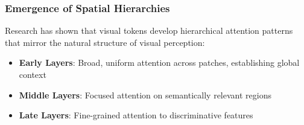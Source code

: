 \subsubsection{Emergence of Spatial Hierarchies}

Research has shown that visual \cls{} tokens develop hierarchical attention patterns that mirror the natural structure of visual perception:

\begin{itemize}
\item \textbf{Early Layers}: Broad, uniform attention across patches, establishing global context
\item \textbf{Middle Layers}: Focused attention on semantically relevant regions
\item \textbf{Late Layers}: Fine-grained attention to discriminative features
\end{itemize}

